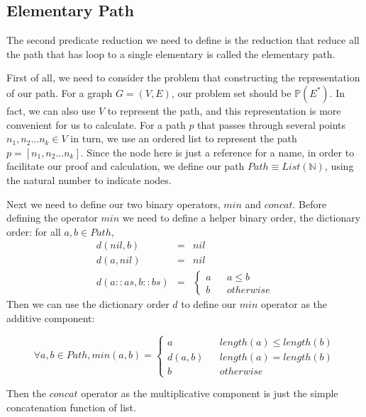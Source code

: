 \documentclass[a4paper,12pt,twoside,openright]{report}
\newcommand{\e}[2]{
\begin{equation}
  \label{#1} 
  #2
\end{equation}
}
\begin{document}
\subsection{Elementary Path}
The second predicate reduction we need to define is the reduction that reduce all the path that has loop to a single elementary is called the elementary path. 

First of all, we need to consider the problem that constructing the representation of our path. For a graph $G = (V,E)$, our problem set should be $\mathbb{P}(E^*)$. In fact, we can also use $V$ to represent the path, and this representation is more convenient for us to calculate. For a path $p$ that passes through several points $n_1,n_2 ... n_k \in V$ in turn, we use an ordered list to represent the path $p = [n_1,n_2 ... n_k]$. 
Since the node here is just a reference for a name, in order to facilitate our proof and calculation, we define our path $Path \equiv List(\mathbb{N})$, using the natural number to indicate nodes.

Next we need to define our two binary operators, $min$ and $concat$. 
Before defining the operator $min$ we need to define a helper binary order, the dictionary order: for all  $a,b \in Path$,
\[
\begin{array}{rcl} 
d(nil,b) & = & nil\\
d(a,nil) & = & nil\\
d(a::as,b::bs) & = & 
\left\{
\begin{aligned}
a &  & a \leq b \\
b &  & otherwise
\end{aligned}
\right.
\end{array}
\] 
Then we can use the dictionary order $d$ to define our $min$ operator as the additive component: 
\e{pf:def:elementary_path_min}{\forall a,b \in Path, min(a,b) = \left\{
\begin{aligned}
a &  & length(a) \leq length(b) \\
d(a,b) &  & length(a) = length(b) \\
b &  & otherwise 
\end{aligned}
\right.}
Then the $concat$ operator as the multiplicative component is just the simple concatenation function of list.
\end{document}
